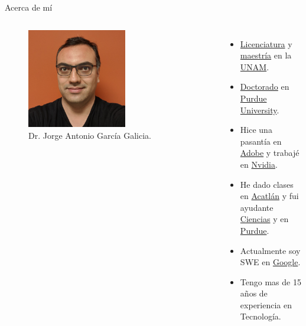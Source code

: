 \begin{frame}{Acerca de mí}
    \begin{columns}
        \begin{figure}[htb]
            \centering
            \includegraphics[width=0.6\textwidth]{img/Avatar12}
            \caption{Dr. Jorge Antonio García Galicia.}
        \end{figure}
     \begin{itemize}
         \item \href{https://mac.acatlan.unam.mx/}{Licenciatura} y \href{https://www.pcic.unam.mx/}{maestría} en la \href{https://www.unam.mx/}{UNAM}.
         \item \href{https://polytechnic.purdue.edu/degrees/phd-technology}{Doctorado} en \href{https://www.purdue.edu/}{Purdue University}.
         \item Hice una pasantía en \href{https://research.adobe.com/}{Adobe} y trabajé en \href{https://www.nvidia.com/}{Nvidia}.
         \item He dado clases en \href{https://www.acatlan.unam.mx/}{Acatlán} y fui ayudante \href{https://www.fciencias.unam.mx/directorio/63922}{Ciencias} y en \href{https://polytechnic.purdue.edu/}{Purdue}.
         \item Actualmente soy SWE en \href{https://about.google/}{Google}.
         \item Tengo mas de 15 años de experiencia en Tecnología.
     \end{itemize}
\end{columns}
\end{frame}


